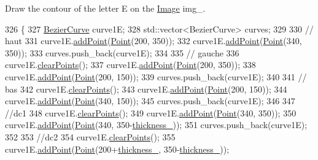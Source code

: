 Draw the contour of the letter E on the \mbox{\hyperlink{class_image}{Image}} img\+\_\+. 


\begin{DoxyCode}
326               \{
327     \mbox{\hyperlink{class_bezier_curve}{BezierCurve}} curve1E;
328     std::vector<BezierCurve> curves;
329 
330     \textcolor{comment}{// haut}
331     curve1E.\mbox{\hyperlink{class_bezier_curve_a38d16c18b36ae45619b05e26e226cf34}{addPoint}}(\mbox{\hyperlink{class_point}{Point}}(200, 350));
332     curve1E.\mbox{\hyperlink{class_bezier_curve_a38d16c18b36ae45619b05e26e226cf34}{addPoint}}(\mbox{\hyperlink{class_point}{Point}}(340, 350));
333     curves.push\_back(curve1E);
334 
335     \textcolor{comment}{// gauche}
336     curve1E.\mbox{\hyperlink{class_bezier_curve_a0ba8ce66d5af5971ae6a1b506029728e}{clearPoints}}();
337     curve1E.\mbox{\hyperlink{class_bezier_curve_a38d16c18b36ae45619b05e26e226cf34}{addPoint}}(\mbox{\hyperlink{class_point}{Point}}(200, 350));
338     curve1E.\mbox{\hyperlink{class_bezier_curve_a38d16c18b36ae45619b05e26e226cf34}{addPoint}}(\mbox{\hyperlink{class_point}{Point}}(200, 150));
339     curves.push\_back(curve1E);
340 
341     \textcolor{comment}{// bas}
342     curve1E.\mbox{\hyperlink{class_bezier_curve_a0ba8ce66d5af5971ae6a1b506029728e}{clearPoints}}();
343     curve1E.\mbox{\hyperlink{class_bezier_curve_a38d16c18b36ae45619b05e26e226cf34}{addPoint}}(\mbox{\hyperlink{class_point}{Point}}(200, 150));
344     curve1E.\mbox{\hyperlink{class_bezier_curve_a38d16c18b36ae45619b05e26e226cf34}{addPoint}}(\mbox{\hyperlink{class_point}{Point}}(340, 150));
345     curves.push\_back(curve1E);
346 
347     \textcolor{comment}{//dc1}
348     curve1E.\mbox{\hyperlink{class_bezier_curve_a0ba8ce66d5af5971ae6a1b506029728e}{clearPoints}}();
349     curve1E.\mbox{\hyperlink{class_bezier_curve_a38d16c18b36ae45619b05e26e226cf34}{addPoint}}(\mbox{\hyperlink{class_point}{Point}}(340, 350));
350     curve1E.\mbox{\hyperlink{class_bezier_curve_a38d16c18b36ae45619b05e26e226cf34}{addPoint}}(\mbox{\hyperlink{class_point}{Point}}(340, 350-\mbox{\hyperlink{class_font_v1_aed8040e76be9a52833627b92f0fb4e5f}{thickness\_}}));
351     curves.push\_back(curve1E);
352 
353     \textcolor{comment}{//dc2}
354     curve1E.\mbox{\hyperlink{class_bezier_curve_a0ba8ce66d5af5971ae6a1b506029728e}{clearPoints}}();
355     curve1E.\mbox{\hyperlink{class_bezier_curve_a38d16c18b36ae45619b05e26e226cf34}{addPoint}}(\mbox{\hyperlink{class_point}{Point}}(200+\mbox{\hyperlink{class_font_v1_aed8040e76be9a52833627b92f0fb4e5f}{thickness\_}}, 350-\mbox{\hyperlink{class_font_v1_aed8040e76be9a52833627b92f0fb4e5f}{thickness\_}}));

\end{DoxyCode}

